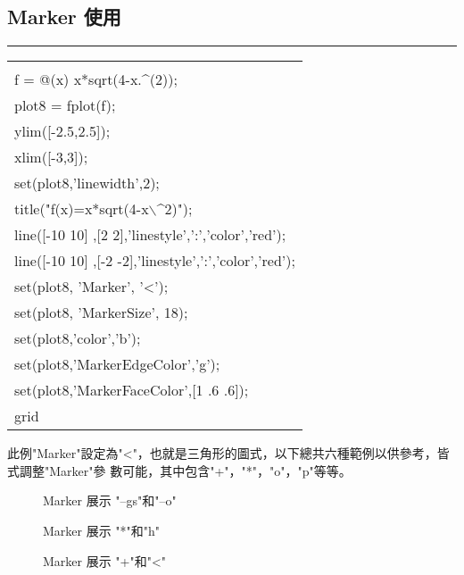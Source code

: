		\subsection{Marker 使用}%
		\rule{\textwidth}{0.2pt}
		\begin{center}\colorbox{slight}{
				\begin{tabular}{p{}}
					\MJHmarker{\textbf{MATLAB語法 :}}\\					
					f = @(x) x*sqrt(4-x.$\^$(2));\\
					plot8 = fplot(f);\\
					ylim([-2.5,2.5]);\\
					xlim([-3,3]);\\
					set(plot8,'linewidth',2);\\
					title("f(x)=x*sqrt(4-x$\backslash\^$2)");\\
					line([-10 10] ,[2 2],'linestyle',':','color','red');\\
					line([-10 10] ,[-2 -2],'linestyle',':','color','red');\\
					set(plot8, 'Marker', '<');\\
					set(plot8, 'MarkerSize', 18); \\
					set(plot8,'color','b');\\
					set(plot8,'MarkerEdgeColor','g');\\
					set(plot8,'MarkerFaceColor',[1 .6 .6]);\\
					grid\\
				\end{tabular}
			}
			\end{center}
		此例"Marker"設定為"<"，也就是三角形的圖式，以下總共六種範例以供參考，皆式調整"Marker"參			數可能，其中包含"+"，"*"，"o"，"p"等等。
		\begin{figure}[H]
    		 \centering
   			 \caption{Marker 展示 "--gs"和"--o"}
   			 \label{plot412}
		\end{figure}	
		\begin{figure}[H]
    		 \centering
   			 \caption{Marker 展示 "*"和"h"}
   			 \label{plot434}
		\end{figure}	
		\begin{figure}[H]
    		 \centering
   			 \caption{Marker 展示 "+"和"<"}
   			 \label{plot456}
		\end{figure}	
